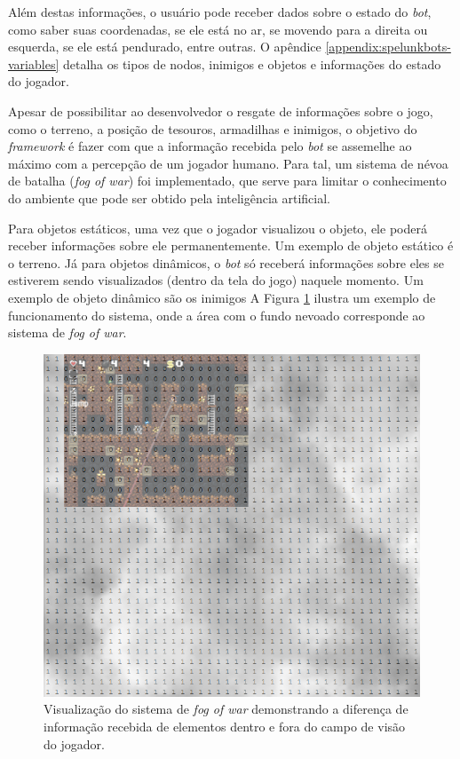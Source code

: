 Além destas informações, o usuário pode receber dados sobre o estado do
\textit{bot}, como saber suas coordenadas, se ele está no ar, se movendo para a
direita ou esquerda, se ele está pendurado, entre outras. O apêndice
\ref{appendix:spelunkbots-variables} detalha os tipos de nodos, inimigos e
objetos e informações do estado do jogador.

Apesar de possibilitar ao desenvolvedor o resgate de informações sobre o jogo,
como o terreno, a posição de tesouros, armadilhas e inimigos, o objetivo do
\textit{framework} é fazer com que a informação recebida pelo \textit{bot} se
assemelhe ao máximo com a percepção de um jogador humano. Para tal, um sistema
de névoa de batalha (\textit{fog of war}) foi implementado, que serve para
limitar o conhecimento do ambiente que pode ser obtido pela inteligência
artificial.

Para objetos estáticos, uma vez que o jogador visualizou o objeto, ele poderá
receber informações sobre ele permanentemente. Um exemplo de objeto estático é o
terreno. Já para objetos dinâmicos, o \textit{bot} só receberá informações sobre
eles se estiverem sendo visualizados (dentro da tela do jogo) naquele momento.
Um exemplo de objeto dinâmico são os inimigos A Figura \ref{fig:spelunkbots-fow}
ilustra um exemplo de funcionamento do sistema, onde a área com o fundo nevoado
corresponde ao sistema de \textit{fog of war}.

\begin{figure}[htb!]
\centering
\includegraphics[width=.65\textwidth]{fig/spelunkbots-fow.png}
\caption {Visualização do sistema de \textit{fog of war} demonstrando a
diferença de informação recebida de elementos dentro e fora do campo de visão do
jogador.}
\label{fig:spelunkbots-fow}
\end{figure}


